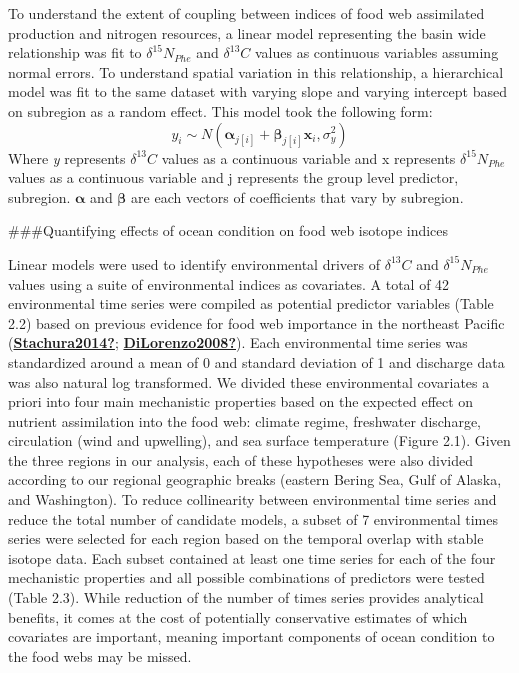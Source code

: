 \documentclass [11pt, proquest] {uwthesis}[2015/03/03]
\begin{document}
To understand the extent of coupling between indices of food web assimilated production and nitrogen resources, a linear model representing the basin wide relationship was fit to \(\delta^{15}N_{Phe}\) and \(\delta^{13}C\) values as continuous variables assuming normal errors. To understand spatial variation in this relationship, a hierarchical model was fit to the same dataset with varying slope and varying intercept based on subregion as a random effect. This model took the following form:
\begin{equation} 
 y_i \sim N(\boldsymbol{\alpha}_{j[i]} + \boldsymbol{\beta}_{j[i]}\boldsymbol{x}_i, \sigma^2_y)
  \label{eq:hiermods}
\end{equation}
Where \emph{y} represents \(\delta^{13}C\) values as a continuous variable and x represents \(\delta^{15}N_{Phe}\) values as a continuous variable and j represents the group level predictor, subregion. \(\boldsymbol{\alpha}\) and \(\boldsymbol{\beta}\) are each vectors of coefficients that vary by subregion.

\#\#\#Quantifying effects of ocean condition on food web isotope indices

Linear models were used to identify environmental drivers of \(\delta^{13}C\) and \(\delta^{15}N_{Phe}\) values using a suite of environmental indices as covariates. A total of 42 environmental time series were compiled as potential predictor variables (Table 2.2) based on previous evidence for food web importance in the northeast Pacific (\protect\hyperlink{ref-Stachura2014}{\textbf{Stachura2014?}}; \protect\hyperlink{ref-DiLorenzo2008}{\textbf{DiLorenzo2008?}}). Each environmental time series was standardized around a mean of 0 and standard deviation of 1 and discharge data was also natural log transformed. We divided these environmental covariates a priori into four main mechanistic properties based on the expected effect on nutrient assimilation into the food web: climate regime, freshwater discharge, circulation (wind and upwelling), and sea surface temperature (Figure 2.1). Given the three regions in our analysis, each of these hypotheses were also divided according to our regional geographic breaks (eastern Bering Sea, Gulf of Alaska, and Washington). To reduce collinearity between environmental time series and reduce the total number of candidate models, a subset of 7 environmental times series were selected for each region based on the temporal overlap with stable isotope data. Each subset contained at least one time series for each of the four mechanistic properties and all possible combinations of predictors were tested (Table 2.3). While reduction of the number of times series provides analytical benefits, it comes at the cost of potentially conservative estimates of which covariates are important, meaning important components of ocean condition to the food webs may be missed.
\end{document}
